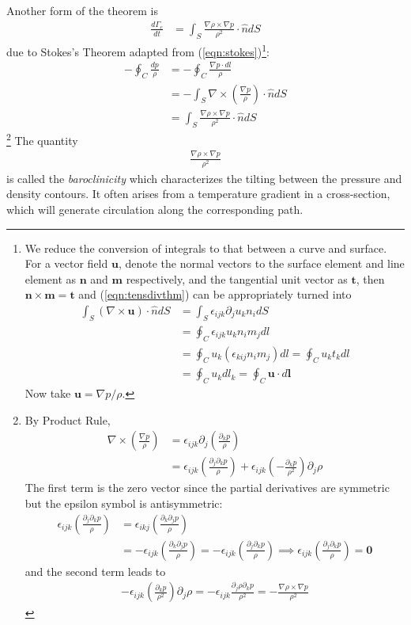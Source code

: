 Another form of the theorem is
\begin{align}
\frac{d\Gamma_c}{dt} &= \int_S \frac{\nabla \rho \times \nabla p}{\rho^2} \cdot \hat{n} dS     
\end{align}
due to Stokes's Theorem adapted from (\ref{eqn:stokes})\footnote{We reduce the conversion of integrals to that between a curve and surface. For a vector field $\textbf{u}$, denote the normal vectors to the surface element and line element as $\textbf{n}$ and $\textbf{m}$ respectively, and the tangential unit vector as $\textbf{t}$, then $\textbf{n} \times \textbf{m} = \textbf{t}$ and (\ref{eqn:tensdivthm}) can be appropriately turned into
\begin{align*}
\int_S (\nabla \times \textbf{u}) \cdot \hat{n} dS &= \int_S \epsilon_{ijk}\partial_j u_k n_i dS \\
&= \oint_C \epsilon_{ijk} u_k n_i m_j dl \\
&= \oint_C u_k (\epsilon_{kij} n_i m_j) dl = \oint_C u_k t_k dl \\
&= \oint_C u_k dl_k = \oint_C \textbf{u} \cdot d\textbf{l}
\end{align*}
Now take $\textbf{u} = \nabla p/\rho$.}:
\begin{align*}
- \oint_C \frac{dp}{\rho} &= - \oint_C \frac{\nabla p \cdot dl}{\rho} \\
&= - \int_S \nabla \times (\frac{\nabla p}{\rho}) \cdot \hat{n} dS \\
&= \int_S  \frac{\nabla \rho \times \nabla p}{\rho^2} \cdot \hat{n} dS     
\end{align*}
\footnote{By Product Rule, \begin{align*}
\nabla \times (\frac{\nabla p}{\rho}) &= \epsilon_{ijk}\partial_j(\frac{\partial_k p}{\rho}) \\
&= \epsilon_{ijk}(\frac{\partial_j\partial_k p}{\rho}) + \epsilon_{ijk}(-\frac{\partial_k p}{\rho^2})\partial_j\rho
\end{align*}
The first term is the zero vector since the partial derivatives are symmetric but the epsilon symbol is antisymmetric:
\vspace{\maxdimen}
\begin{align*}
\epsilon_{ijk}(\frac{\partial_j\partial_k p}{\rho}) &= \epsilon_{ikj}(\frac{\partial_k\partial_j p}{\rho}) \\
&= -\epsilon_{ijk}(\frac{\partial_k\partial_j p}{\rho}) = -\epsilon_{ijk}(\frac{\partial_j\partial_k p}{\rho}) \implies \epsilon_{ijk}(\frac{\partial_j\partial_k p}{\rho}) = \textbf{0}
\end{align*}
and the second term leads to
\begin{align*}
-\epsilon_{ijk}(\frac{\partial_k p}{\rho^2})\partial_j\rho = -\epsilon_{ijk}\frac{\partial_j\rho \partial_k p}{\rho^2} = -\frac{\nabla \rho \times \nabla p}{\rho^2}
\end{align*}}
The quantity 
\begin{align}
\frac{\nabla \rho \times \nabla p}{\rho^2}    
\end{align}
is called the \textit{baroclinicity} which characterizes the tilting between the pressure and density contours. It often arises from a temperature gradient in a cross-section, which will generate circulation along the corresponding path.

